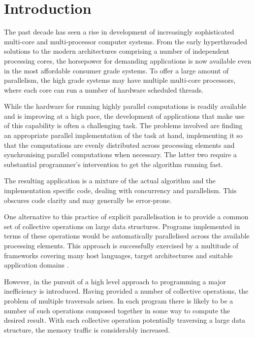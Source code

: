 \documentclass[preamble.tex]{subfiles}
\begin{document}
\clearpage

\chapter{Introduction}
\label{ch:introduction}

The past decade has seen a rise in development of increasingly sophisticated multi-core and multi-processor computer systems. From the early hyperthreaded solutions to the modern architectures comprising a number of independent processing cores, the horsepower for demanding applications is now available even in the most affordable consumer grade systems. To offer a large amount of parallelism, the high grade systems may have multiple multi-core processors, where each core can run a number of hardware scheduled threads.

While the hardware for running highly parallel computations is readily available and is improving at a high pace, the development of applications that make use of this capability is often a challenging task. The problems involved are finding an appropriate parallel implementation of the task at hand, implementing it so that the computations are evenly distributed across processing elements and synchronising parallel computations when necessary. The latter two require a substantial programmer's intervention to get the algorithm running fast.


The resulting application is a mixture of the actual algorithm and the implementation specific code, dealing with concurrency and parallelism. This obscures code clarity and may generally be error-prone.

One alternative to this practice of explicit parallelisation is to provide a common set of collective operations\icollop{} on large data structures. Programs implemented in terms of these operations would be automatically parallelised across the available processing elements. This approach is successfully exercised by a multitude of frameworks covering many host languages, target architectures and suitable application domains \cite{PLKC08,KCL+10,CKL+11,AS07}.

However, in the pursuit of a high level approach to programming a major inefficiency is introduced. Having provided a number of collective operations, the problem of multiple traversals arises. In each program there is likely to be a number of such operations composed together in some way to compute the desired result. With each collective operation potentially traversing a large data structure, the memory traffic is considerably increased.
\end{document}
